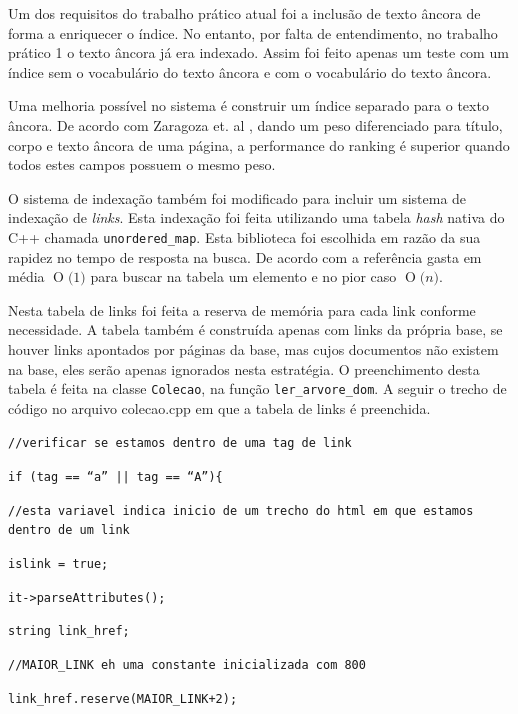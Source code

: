 \documentclass[a4paper]{article}
\newcommand{\BigO}[1]{\ensuremath{\operatorname{O}\bigl(#1\bigr)}}
\begin{document}
Um dos requisitos do trabalho prático atual foi a inclusão de 
texto âncora de forma a enriquecer o índice. No entanto, por falta de 
entendimento, no trabalho prático 1 o texto âncora já era indexado. Assim 
foi feito apenas um teste com um índice sem o vocabulário do texto âncora e com 
o vocabulário do texto âncora.

Uma melhoria possível no sistema é construir um índice separado para
o texto âncora. De acordo com Zaragoza et. al 
\cite{zaragoza2004microsoft}, dando um peso diferenciado para título, corpo 
e texto âncora de uma página, a performance do ranking é superior quando 
todos estes campos possuem o mesmo peso.

O sistema de indexação também foi modificado para incluir um sistema 
de indexação de \emph{links}. Esta indexação foi feita utilizando 
uma tabela \emph{hash} nativa do C++ chamada \texttt{unordered\_map}\cite{cplusplus}. 
Esta biblioteca foi escolhida em razão da sua rapidez no tempo de resposta 
na busca. De acordo com a referência gasta em média \BigO{1} para buscar 
na tabela um elemento e no pior caso \BigO{n}.

Nesta tabela de links foi feita a reserva de memória para cada link conforme 
necessidade. A tabela também é construída apenas com links da própria base, 
se houver links apontados por páginas da base, mas cujos documentos não 
existem na base, eles serão apenas ignorados nesta estratégia. 
O preenchimento desta tabela é feita na classe \texttt{Colecao}, na 
função \texttt{ler\_arvore\_dom}. A seguir o trecho de código no 
arquivo colecao.cpp em que a tabela de links é preenchida.

\texttt{//verificar se estamos dentro de uma tag de link }

\texttt{if (tag == ``a'' || tag == ``A'')\{}

\texttt{//esta variavel indica inicio de um trecho do html em que estamos dentro de um link}

\hspace{0.5cm}\texttt{islink = true;}

\hspace{0.5cm}\texttt{it->parseAttributes();}

\hspace{0.5cm}\texttt{string link\_href;}

\hspace{0.5cm}\texttt{//MAIOR\_LINK eh uma constante inicializada com 800}

\hspace{0.5cm}\texttt{link\_href.reserve(MAIOR\_LINK+2);}
\end{document}
